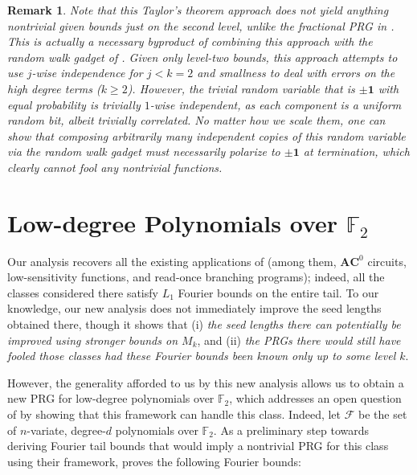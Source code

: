 \documentclass[10pt,a4paper]{article}
\newtheorem{remark}[theorem]{Remark}
\theoremstyle{definition}
\begin{document}
\begin{remark} \label{rem:lev-2}
Note that this Taylor's theorem approach does not yield anything nontrivial given bounds just on the second level, unlike the fractional PRG in \cite{CHLT}. This is actually a necessary byproduct of combining this approach with the random walk gadget of \cite{CHHL}. Given only level-two bounds, this approach attempts to use $j$-wise independence for $j<k=2$ and smallness to deal with errors on the high degree terms ($k\geq 2$). However, the trivial random variable that is $\pm \mathbf{1}$ with equal probability is trivially $1$-wise independent, as each component is a uniform random bit, albeit trivially correlated. No matter how we scale them, one can show that composing arbitrarily many independent copies of this random variable via the random walk gadget must necessarily polarize to $\pm \mathbf{1}$ at termination, which clearly cannot fool any nontrivial functions.  
\end{remark}





\section{Low-degree Polynomials over $\mathbb{F}_2$}
\label{sec:apps}

Our analysis recovers all the existing applications of \cite{CHHL} (among them, $\mathbf{AC}^0$ circuits, low-sensitivity functions, and read-once branching programs); indeed, all the classes considered there satisfy $L_1$ Fourier bounds on the entire tail. To our knowledge, our new analysis does not immediately improve the seed lengths obtained there, though it shows that (i) \emph{the seed lengths there can potentially be improved using stronger bounds on $M_k$}, and (ii) \emph{the PRGs there would still have fooled those classes had these Fourier bounds been known only up to some level $k$}.

However, the generality afforded to us by this new analysis allows us to obtain a new PRG for low-degree polynomials over $\mathbb{F}_2$, which addresses an open question of \cite{CHHL} by showing that this framework can handle this class. Indeed, let $\mathcal{F}$ be the set of $n$-variate, degree-$d$ polynomials over $\mathbb{F}_2$. As a preliminary step towards deriving Fourier tail bounds that would imply a nontrivial PRG for this class using their framework, \cite{CHHL} proves the following Fourier bounds:
\end{document}
